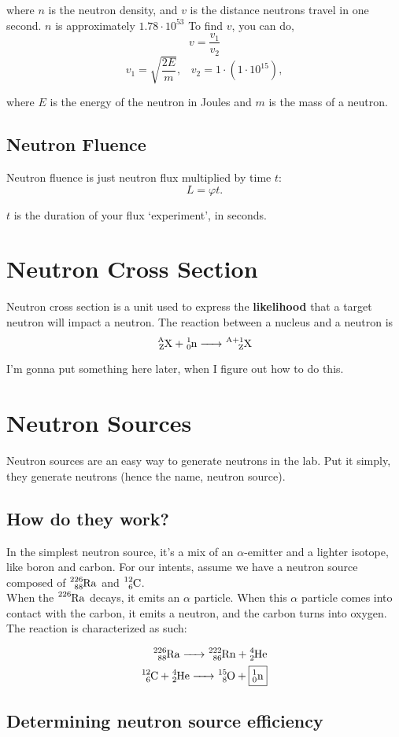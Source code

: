 \documentclass{article}
\begin{document}
\begin{multicols*}{2}
    where $n$ is the neutron density, and $v$ is the distance neutrons travel
    in one second. $n$ is approximately $1.78\cdot 10^{53}$ To find $v$, you can do,
      \[
        v = \frac{v_1}{v_2}
      \]\[
        v_1 = \sqrt{\frac{2E}{m}},\;\;\;
        v_2 = 1 \cdot \left(1 \cdot 10^{15}\right),
      \]

      where $E$ is the energy of the neutron in Joules and $m$ is the mass of a neutron.

    \subsection{Neutron Fluence}
    Neutron fluence is just neutron flux multiplied by time $t$:
    \[
      L = \varphi{t}.
    \]

    $t$ is the duration of your flux `experiment', in seconds.

    \section{Neutron Cross Section}
    Neutron cross section is a unit used to express the \textbf{likelihood} that
    a target neutron will impact a neutron. The reaction between a nucleus and a
    neutron is
    \[
      \ce{^{A}_{Z}X + ^{1}_{0}n -> ^{A+1}_{Z}X}
    \]

    
    I'm gonna put something here later, when I figure out how to do this.
  
    \section{Neutron Sources}
    Neutron sources are an easy way to generate neutrons in the lab. Put
    it simply, they generate neutrons (hence the name, neutron source).

    \subsection{How do they work?}
    In the simplest neutron source, it's a mix of an $\alpha$-emitter and
    a lighter isotope, like boron and carbon. For our intents, assume we
    have a neutron source composed of $\ce{^{226}_{88}Ra}$ and $\ce{^{12}_{6}C}$.\\

    When the $\ce{^{226}Ra}$ decays, it emits an $\alpha$ particle. When this
    $\alpha$ particle comes into contact with the carbon, it emits a neutron,
    and the carbon turns into oxygen. The reaction is characterized as such:

    \begin{equation*}
      \begin{split}
        \ce{^{226}_{88}Ra -> ^{222}_{86}Rn + ^{4}_{2}He} \\
        \ce{^{12}_{6}C + ^{4}_{2}He -> ^{15}_{8}O + \boxed{^{1}_{0}\ce{n}}}
      \end{split}
    \end{equation*}
    \subsection{Determining neutron source efficiency}
  \end{multicols*}
\end{document}
